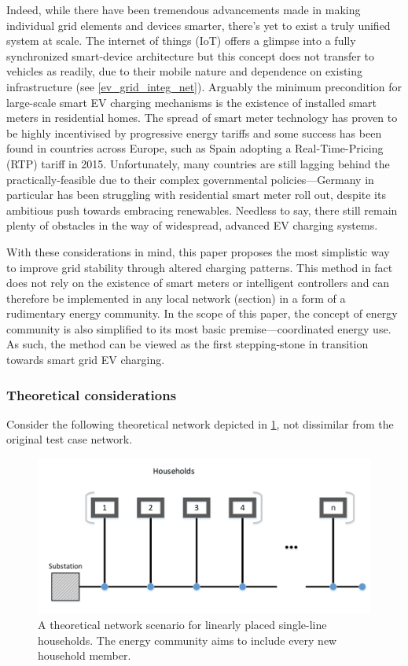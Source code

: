 \documentclass[a4paper,10pt]{report}
\begin{document}
Indeed, while there have been tremendous advancements made in making individual grid elements and devices smarter, there's yet to exist a truly unified system at scale. The internet of things (IoT) offers a glimpse into a fully synchronized smart-device architecture but this concept does not transfer to vehicles as readily, due to their mobile nature and dependence on existing infrastructure (see \cref{ev_grid_integ_net}). Arguably the minimum precondition for large-scale smart EV charging mechanisms is the existence of installed smart meters in residential homes. The spread of smart meter technology has proven to be highly incentivised by progressive energy tariffs and some success has been found in countries across Europe, such as Spain adopting a Real-Time-Pricing (RTP) tariff in 2015. Unfortunately, many countries are still lagging behind the practically-feasible due to their complex governmental policies---Germany in particular has been struggling with residential smart meter roll out, despite its ambitious push towards embracing renewables. Needless to say, there still remain plenty of obstacles in the way of widespread, advanced EV charging systems.

With these considerations in mind, this paper proposes the most simplistic way to improve grid stability through altered charging patterns. This method in fact does not rely on the existence of smart meters or intelligent controllers and can therefore be implemented in any local network (section) in a form of a rudimentary energy community. In the scope of this paper, the concept of energy community is also simplified to its most basic premise---coordinated energy use. As such, the method can be viewed as the first stepping-stone in transition towards smart grid EV charging. 

\subsubsection{Theoretical considerations}\label{subsubsection_theoretical_con}

Consider the following theoretical network depicted in \cref{comm_topology}, not dissimilar from the original test case network.

\begin{figure}[htpb]
	\centering
	\includegraphics[width=0.7\linewidth]{comm_topology}
	\caption[Theoretical energy community network scenario]{A theoretical network scenario for linearly placed single-line households. The energy community aims to include every new household member.}
	\label{comm_topology}
\end{figure}
\end{document}
